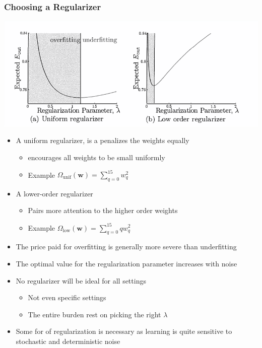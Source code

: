 \documentclass[11pt]{article}
\begin{document}
\subsubsection{Choosing a Regularizer}
\label{sec:orga172df2}
\begin{center}
\includegraphics[width=.9\linewidth]{Overfitting (4)/screenshot_2018-09-18_08-32-17.png}
\end{center}

\begin{itemize}
\item A uniform regularizer, is a penalizes the weights equally
\begin{itemize}
\item encourages all weights to be small uniformly
\item Example \(\Omega_\text{unif}(\pmb w)= \sum_{q=0}^{15}w_q^2\)
\end{itemize}
\item A lower-order regularizer
\begin{itemize}
\item Pairs more attention to the higher order weights
\item Example \(\Omega_\text{low}(\pmb w)= \sum_{q=0}^{15}qw_q^2\)
\end{itemize}

\item The price paid for overfitting is generally more severe than underfitting
\item The optimal  value for the regularization parameter increases with noise
\item No regularizer will be ideal for all settings
\begin{itemize}
\item Not even specific settings
\item The entire burden rest on picking the right \(\lambda\)
\end{itemize}
\item Some for of regularization is necessary as learning is quite sensitive to stochastic and deterministic noise
\end{itemize}
\end{document}

